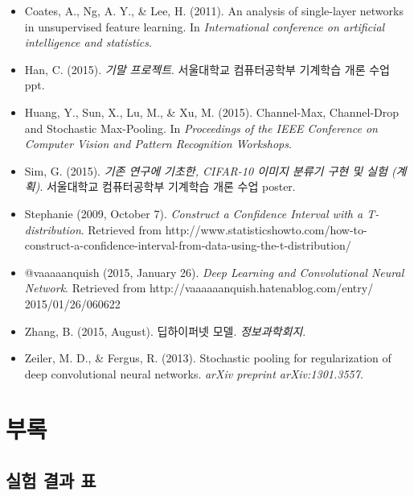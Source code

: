 \documentclass[a4paper,9pt,hidelinks]{article}
\begin{document}
\begin{multicols*}{2}
\begin{itemize}
\item Coates, A., Ng, A. Y., \& Lee, H. (2011). An analysis of single-layer networks in unsupervised feature learning. In \textit{International conference on artificial intelligence and statistics}.
\item Han, C. (2015). \textit{기말 프로젝트}. 서울대학교 컴퓨터공학부 기계학습 개론 수업 ppt.
\item Huang, Y., Sun, X., Lu, M., \& Xu, M. (2015). Channel-Max, Channel-Drop and Stochastic Max-Pooling. In \textit{Proceedings of the IEEE Conference on Computer Vision and Pattern Recognition Workshops}.
\item Sim, G. (2015). \textit{기존 연구에 기초한, CIFAR-10 이미지 분류기 구현 및 실험 (계획)}. 서울대학교 컴퓨터공학부 기계학습 개론 수업 poster.
\item Stephanie (2009, October 7). \textit{Construct a Confidence Interval with a T-distribution}. Retrieved from http://www.statisticshowto.com/how-to-construct-a-confidence-interval-from-data-using-the-t-distribution/
\item @vaaaaanquish (2015, January 26). \textit{Deep Learning and Convolutional Neural Network}. Retrieved from http://vaaaaaanquish.hatenablog.com/entry/ 2015/01/26/060622
\item Zhang, B. (2015, August). 딥하이퍼넷 모델. \textit{정보과학회지}.
\item Zeiler, M. D., \& Fergus, R. (2013). Stochastic pooling for regularization of deep convolutional neural networks. \textit{arXiv preprint arXiv:1301.3557}.
\end{itemize}

\end{multicols*}

\pagebreak

\section*{부록}

\subsection*{실험 결과 표}
\end{document}
